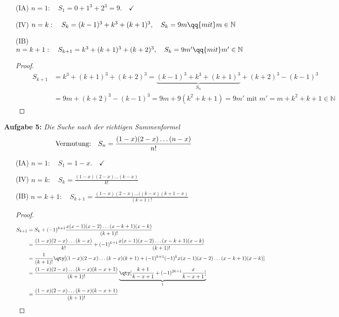 \begin{enumerate}
    \item[(IA)] $n=1: \quad S_1 = 0 + 1^3 + 2^3 = 9. \quad\checkmark$ 
    \item[(IV)] $n=k: \quad S_k = (k-1)^3 + k^3 + (k+1)^3, \quad S_k = 9m \qq{mit} m \in \mathbb{N}$
    \item[(IB)] $n=k+1: \quad S_{k+1} = k^3 + (k+1)^3 + (k+2)^3, \quad S_k = 9m' \qq{mit} m' \in \mathbb{N}$\\
    \begin{proof}$~$\\[-1.4cm]
        \begin{align}
            \qquad S_{k+1}&=k^3+(k+1)^3+(k+2)^3=\underbrace{(k-1)^3+k^3+(k+1)^3}_{S_n}+(k+2)^3-(k-1)^3\\
            &=9m+(k+2)^3-(k-1)^3=9m+9(k^2+k+1)=9m' \text{ mit } m'=m+k^2+k+1\in\mathbb{N}
        \end{align}
    \end{proof}
\end{enumerate}
%
\textbf{Aufgabe 5: } \emph{Die Suche nach der richtigen Summenformel}\\
\begin{align}
\text{Vermutung: }\hspace{0.2cm} S_n=\frac{(1-x)(2-x)\dots(n-x)}{n!} \hspace{0.5cm}
\end{align}

\begin{enumerate}
    \setlength{\mathindent}{0cm}
    \item[(IA)] $n=1: \quad S_1 = 1-x. \quad\checkmark$ 
    \item[(IV)] $n=k: \quad S_k = \frac{(1-x)(2-x)\dots(k-x)}{k!}$
    \item[(IB)] $n=k+1: \quad S_{k+1} = \frac{(1-x)(2-x)\dots((k-x)(k+1-x)}{(k+1)!}$\\
    \begin{proof}
        \begin{align}
            S_{k+1}&=S_k+(-1)^{k+1}\frac{x(x-1)(x-2)\dots(x-k+1)(x-k)}{(k+1)!}\\
            &=\frac{(1-x)(2-x)\dots(k-x)}{k!}+(-1)^{k+1}\frac{x(x-1)(x-2)\dots(x-k+1)(x-k)}{(k+1)!}\\
            &=\frac{1}{(k+1)!}\qty[(1-x)(2-x)\dots(k-x)(k+1)+(-1)^{k+1}(-1)^kx(x-1)(x-2)\dots(x-k+1)(x-k)]\\
            &=\frac{(1-x)(2-x)\dots(k-x)(k-x+1)}{(k+1)!}\underbrace{\qty[\frac{k+1}{k-x+1}+(-1)^{2k+1}\frac{x}{k-x+1}]}_1\\
            &=\frac{(1-x)(2-x)\dots(k-x)(k-x+1)}{(k+1)!}
        \end{align}
    \end{proof}
\end{enumerate}


